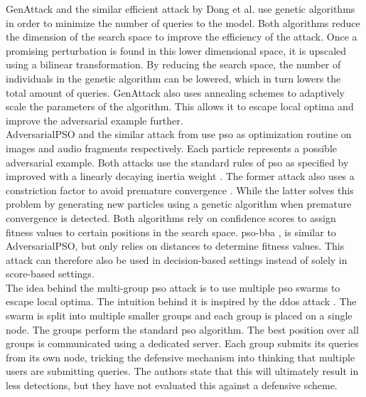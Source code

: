 GenAttack \cite{genattack} and the similar efficient attack by Dong et al. \cite{dong2019efficient} use genetic algorithms in order to minimize the number of queries to the model. Both algorithms reduce the dimension of the search space to improve the efficiency of the attack. Once a promising perturbation is found in this lower dimensional space, it is upscaled using a bilinear transformation. By reducing the search space, the number of individuals in the genetic algorithm can be lowered, which in turn lowers the total amount of queries. GenAttack also uses annealing schemes to adaptively scale the parameters of the algorithm. This allows it to escape local optima and improve the adversarial example further. \\

AdversarialPSO \cite{mosli2019they} and the similar attack from \cite{audio_pso} use \gls{pso} as optimization routine on images and audio fragments respectively. Each particle represents a possible adversarial example. Both attacks use the standard rules of \gls{pso} as specified by \cite{pso} improved with a linearly decaying inertia weight \cite{inertia_weight}. The former attack also uses a constriction factor to avoid premature convergence \cite{constriction_factor}. While the latter solves this problem by generating new particles using a genetic algorithm when premature convergence is detected. Both algorithms rely on confidence scores to assign fitness values to certain positions in the search space. \gls{pso}-\gls{bba} \cite{distributed_pso_attack}, is similar to AdversarialPSO, but only relies on distances to determine fitness values. This attack can therefore also be used in decision-based settings instead of solely in score-based settings.\\

The idea behind the multi-group \gls{pso} attack \cite{suryanto2020} is to use multiple \gls{pso} swarms to escape local optima. The intuition behind it is inspired by the \gls{ddos} attack \cite{ddos}. The swarm is split into multiple smaller groups and each group is placed on a single node. The groups perform the standard \gls{pso} algorithm. The best position over all groups is communicated using a dedicated server. Each group submits its queries from its own node, tricking the defensive mechanism into thinking that multiple users are submitting queries. The authors state that this will ultimately result in less detections, but they have not evaluated this against a defensive scheme.\\

